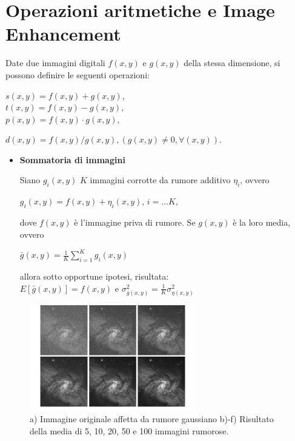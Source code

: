 \section{Operazioni aritmetiche e Image Enhancement}
Date due immagini digitali $f(x,y)$ e $g(x,y)$ della stessa dimensione, si possono definire le seguenti operazioni:
\begin{center}
    $s(x,y) = f(x,y) + g(x,y),$
    \\$t(x,y) = f(x,y)-g(x,y),$
        \\$p(x,y)=f(x,y)·g(x,y),$
\end{center}
$d(x,y) = f(x,y)/g(x,y), (g(x,y) \neq 0, \forall(x,y)).$
\begin{itemize}
    \item \textbf{Sommatoria di immagini}

          Siano $g_i(x,y)$ $K$ immagini corrotte da rumore additivo $\eta_i$,
          ovvero
          \begin{center}
              $g_i(x,y) = f(x,y) + \eta_i(x,y)$, $i=...K,$
          \end{center}
          dove $f(x,y)$ è l'immagine priva di rumore. Se $g(x,y)$ è la loro media, ovvero
          \begin{center}
              $\bar{g}(x,y)=\frac{1}{K} \sum_{i=1}^{K}g_i(x,y)$
          \end{center}
          allora sotto opportune ipotesi, risultata:
          \\$E[\bar{g}(x,y)] = f(x,y)$ e $\sigma^2_{\bar{g}(x,y)}=\frac{1}{K}\sigma^2_{\eta(x,y)}$
\end{itemize}
\begin{figure}[H]
    \centering
    \includegraphics[width=\linewidth, keepaspectratio]{capitoli/immagini/imgs/sommatoria-immagini.png}
    \caption*{a) Immagine originale affetta da rumore gaussiano
        b)-f) Risultato della media di 5, 10, 20, 50 e 100 immagini
        rumorose.}
\end{figure}

